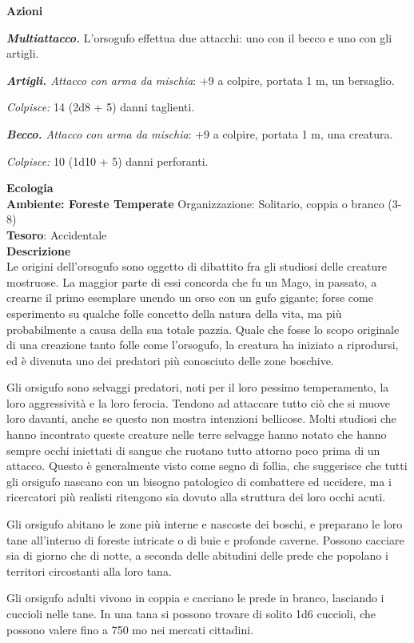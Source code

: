 \begin{multicols}{2}
	\textbf{Azioni}

	\textit{\textbf{Multiattacco.}} L'orsogufo effettua due attacchi: uno con il becco e uno con gli artigli.

	\textit{\textbf{Artigli.} Attacco con arma da mischia}: +9 a colpire, portata 1 m, un bersaglio.

	\textit{Colpisce:} 14 (2d8 + 5) danni taglienti.

	\textit{\textbf{Becco.} Attacco con arma da mischia}: +9 a colpire, portata 1 m, una creatura.

	\textit{Colpisce:} 10 (1d10 + 5) danni perforanti.

	\textbf{Ecologia}\\
	\textbf{Ambiente: Foreste Temperate}
	Organizzazione: Solitario, coppia o branco (3-8)\\
	\textbf{Tesoro}: Accidentale\\
	\textbf{Descrizione}\\
	Le origini dell'orsogufo sono oggetto di dibattito fra gli studiosi delle creature mostruose. La maggior parte di essi concorda che fu un Mago, in passato, a crearne il primo esemplare unendo un orso con un gufo gigante; forse come esperimento su qualche folle concetto della natura della vita, ma più probabilmente a causa della sua totale pazzia. Quale che fosse lo scopo originale di una creazione tanto folle come l'orsogufo, la creatura ha iniziato a riprodursi, ed è divenuta uno dei predatori più conosciuto delle zone boschive.

	Gli orsigufo sono selvaggi predatori, noti per il loro pessimo temperamento, la loro aggressività e la loro ferocia. Tendono ad attaccare tutto ciò che si muove loro davanti, anche se questo non mostra intenzioni bellicose. Molti studiosi che hanno incontrato queste creature nelle terre selvagge hanno notato che hanno sempre occhi iniettati di sangue che ruotano tutto attorno poco prima di un attacco. Questo è generalmente visto come segno di follia, che suggerisce che tutti gli orsigufo nascano con un bisogno patologico di combattere ed uccidere, ma i ricercatori più realisti ritengono sia dovuto alla struttura dei loro occhi acuti.

	Gli orsigufo abitano le zone più interne e nascoste dei boschi, e preparano le loro tane all'interno di foreste intricate o di buie e profonde caverne. Possono cacciare sia di giorno che di notte, a seconda delle abitudini delle prede che popolano i territori circostanti alla loro tana.

	Gli orsigufo adulti vivono in coppia e cacciano le prede in branco, lasciando i cuccioli nelle tane. In una tana si possono trovare di solito 1d6 cuccioli, che possono valere fino a 750 mo nei mercati cittadini.


\end{multicols}
